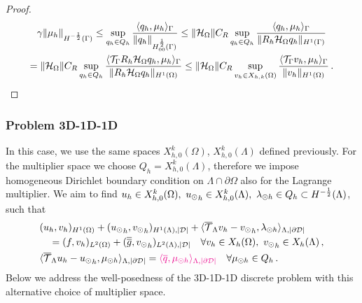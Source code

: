 \documentclass[r]{siamart171218}
\newcommand{\paolo}[1]{{\color{magenta}#1}}
\begin{document}
\begin{proof}
\begin{multline*}
\gamma \|\mu_h\|_{H^{-\frac 12}(\Gamma)} 
\leq 
\sup_{q_h \in Q_h} \frac{ \langle q_h, \mu_h \rangle_{\Gamma} } {\|q_h\|_{H^{\frac 12}_{00}(\Gamma)}} 
\leq
\|\mathcal{H}_{\Omega}\| C_R \sup_{q_h \in Q_h} \frac{ \langle q_h, \mu_h \rangle_{\Gamma} } {\|R_h \mathcal{H}_{\Omega} q_h\|_{H^1(\Gamma)}}
\\
=
\|\mathcal{H}_{\Omega}\| C_R \sup_{q_h \in Q_h} \frac{ \langle {\mathcal{T}_\Gamma} R_h  \mathcal{H}_{\Omega}q_h, \mu_h \rangle_{\Gamma} } {\|R_h \mathcal{H}_{\Omega} q_h\|_{H^1(\Omega)}} 
\leq \|\mathcal{H}_{\Omega}\| C_R \sup_{v_h \in X_{h,k}(\Omega)} \frac{ \langle {\mathcal{T}_\Gamma} v_h, \mu_h \rangle_{\Gamma} } {\|v_h\|_{H^1(\Omega)}}\,. 
\end{multline*}
\end{proof}


\subsubsection{Problem 3D-1D-1D}
In this case, we use the same spaces $X_{h,0}^k(\Omega)$, $X_{h,0}^k(\Lambda)$ defined previously.
For the multiplier space we choose $Q_h=X_{h,0}^k(\Lambda)$, therefore we impose homogeneous Dirichlet boundary condition on $\Lambda \cap \partial \Omega$ also for the Lagrange multiplier. 
We aim to find  $u_h \in X_{h,0}^k(\Omega) ,\ {u_{\odot}}_h \in X_{h,0}^k(\Lambda), \ \lambda_{\odot h} \in Q_h \subset H^{-\frac12}(\Lambda)$, such that
\begin{subequations}
\begin{align}\label{eq:prob2_discrete}
&(u_h,v_h)_{H^1(\Omega)} + ({\ud}_h,{\vd}_h)_{H^1(\Lambda), |{\cal D}|} 
+  \langle  \mtrace v_h -  {\vd}_h, \ldh \rangle_{\Lambda, |\DD|} 
\\
\nonumber
&\quad = (f,v_h)_{L^2(\Omega)} + (\avrd{g},{\vd}_h)_{L^2(\Lambda),|\D|}
\quad \forall v_h \in X_h(\Omega), \ {\vd}_h \in X_h(\Lambda)\,,
\\
& \langle \mtrace u_h - {\ud}_h, \mdh \rangle_{\Lambda,| \DD| } 
= \paolo{\langle \avrc{q},\mdh \rangle_{\Lambda,|\DD|}}
\quad \forall \mdh \in Q_h\,.
\end{align}
\end{subequations}
Below we address the well-posedness of the 3D-1D-1D discrete problem with this alternative choice of multiplier space.
\end{document}

